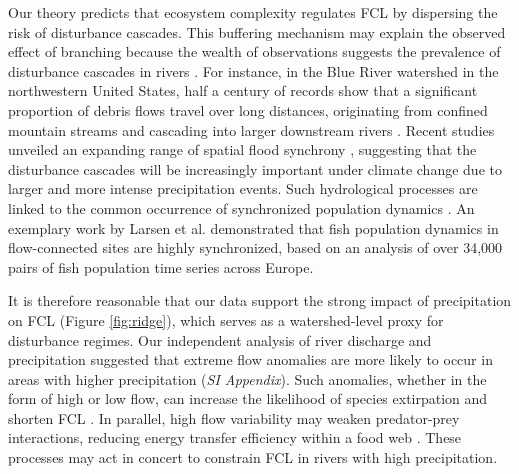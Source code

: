 \documentclass[11pt, class=article, crop=false]{standalone}
\begin{document}
Our theory predicts that ecosystem complexity regulates FCL by dispersing the risk of disturbance cascades.
This buffering mechanism may explain the observed effect of branching because the wealth of observations suggests the prevalence of disturbance cascades in rivers \citep{swanson_flood_1998, nakamura_disturbance_2000, berghuijs_growing_2019, sarremejane_drought_2021, sharma_spatial_2024}.
For instance, in the Blue River watershed in the northwestern United States, half a century of records show that a significant proportion of debris flows travel over long distances, originating from confined mountain streams and cascading into larger downstream rivers \citep{nakamura_disturbance_2000}.
Recent studies unveiled an expanding range of spatial flood synchrony \citep{berghuijs_growing_2019, sharma_spatial_2024}, suggesting that the disturbance cascades will be increasingly important under climate change due to larger and more intense precipitation events.
Such hydrological processes are linked to the common occurrence of synchronized population dynamics \citep{sarremejane_drought_2021, larsen_geography_2021}.
An exemplary work by Larsen et al. \citep{larsen_geography_2021} demonstrated that fish population dynamics in flow-connected sites are highly synchronized, based on an analysis of over 34,000 pairs of fish population time series across Europe.

It is therefore reasonable that our data support the strong impact of precipitation on FCL (Figure \ref{fig:ridge}), which serves as a watershed-level proxy for disturbance regimes.
Our independent analysis of river discharge and precipitation suggested that extreme flow anomalies are more likely to occur in areas with higher precipitation (\textit{SI Appendix}).
Such anomalies, whether in the form of high or low flow, can increase the likelihood of species extirpation and shorten FCL \citep{sabo_food_2009}.
In parallel, high flow variability may weaken predator-prey interactions, reducing energy transfer efficiency within a food web \citep{baruch_food_2023}.
These processes may act in concert to constrain FCL in rivers with high precipitation.
\end{document}
